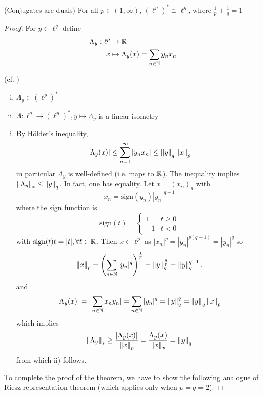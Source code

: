 \documentclass{article}
\begin{document}
\begin{theorem}
    (Conjugates are duals) For all  \(p \in (1, \infty)\),  \((\ell^p)^* \cong \ell^q\), where  \(\frac{1}{p}+\frac{1}{q}=1\)
\end{theorem}  

\begin{proof}
    For  \(y \in \ell^q\) define  
    \begin{align*}
        \Lambda_y: \ell^p &\to \mathbb{R} \\
        x &\mapsto \Lambda_y(x) = \sum_{n \in \mathbb{N}} y_n x_n
    \end{align*}
\begin{lemma} (cf. )
    \label{isometry in lp dual}
\begin{enumerate}[i)]
    \item  \(\Lambda_y \in (\ell^p)^*\)
    \item  \(\Lambda: \ell^q \to (\ell^p)^*, y \mapsto \Lambda_y\) is a linear isometry
\end{enumerate}  
\end{lemma}
\begin{enumerate}[i)]
    \item By Hölder's inequality,  
    	\begin{equation*}
		\left|\Lambda_y(x)\right|
		\leq\sum_{n=1}^{\infty}|y_n x_n|
		\leq\left\|{y}\right\|_q\left\|{x}\right\|_p
	\end{equation*}
	in particular  \(\Lambda_y\) is well-defined (i.e. maps to  \(\mathbb{R}\)). The inequality implies  \(\left\|{\Lambda_y}\right\|_* \leq \left\|{y}\right\|_q\).   
	In fact, one has equality. Let  \(x=(x_n)_n\) with  
	\[x_n = \textrm{sign}(y_n) |y_n|^{q-1}\]
	where the sign function is  
	\begin{equation*}
	    \textrm{sign}(t) = \begin{cases}
	    1 & t \geq 0 \\
	    -1 & t<0
	\end{cases}
	\end{equation*}
	with  \(\textrm{sign}(t)t=|t|, \forall t \in \mathbb{R}\).  
	Then  \(x \in \ell^p\) as  \(|x_n|^p=|y_n|^{p(q-1)}=|y_n|^q\) so  
	\[
	\left\|{x}\right\|_p = \left(\sum_{n \in \mathbb{N}} |y_n|^q\right)^{\frac{1}{p}} = \left\|{y}\right\|_q^{\frac{q}{p}} = \left\|{y}\right\|_q^{q-1}. 
	\]
	and
	\[
	|\Lambda_y(x)| = |\sum_{n \in \mathbb{N}} x_ny_n| = \sum_{n \in \mathbb{N}} |y_n|^q = \left\|{y}\right\|^q_q =\left\|{y}\right\|_q\left\|{x}\right\|_p 
	\]
	which implies  
	\[
        \left\|{\Lambda_y}\right\|_* \geq \frac{|\Lambda_y(x)|}{\left\|{x}\right\|_p} = \frac{\Lambda_y(x)}{\left\|{x}\right\|_p} = \left\|{y}\right\|_q
	\]
        from which ii) follows.
\end{enumerate}
To complete the proof of the theorem, we have to show the following analogue of Riesz representation theorem (which applies only when  \(p=q=2\)).  


\end{proof}
\end{document}
